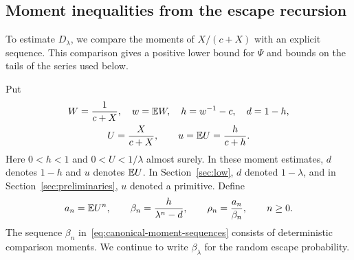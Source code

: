 \subsection{Moment inequalities from the escape recursion}
To estimate $D_\lambda$, we compare the moments of $X/(c+X)$ with an explicit sequence. This comparison gives a positive lower bound for $\Psi$ and bounds on the tails of the series used below.

Put
\begin{equation}\label{eq:archive-parameters}
 \begin{gathered}
 W=\frac1{c+X},\quad w=\mathbb E W,\quad h=w^{-1}-c,\quad d=1-h,\\
 U=\frac{X}{c+X},\qquad u=\mathbb E U=\frac{h}{c+h}.
 \end{gathered}
\end{equation}
Here $0<h<1$ and $0<U<1/\lambda$ almost surely. In these moment estimates, $d$ denotes $1-h$ and $u$ denotes $\mathbb E U$. In Section~\ref{sec:low}, $d$ denoted $1-\lambda$, and in Section~\ref{sec:preliminaries}, $u$ denoted a primitive. Define
\begin{equation}\label{eq:canonical-moment-sequences}
 a_n=\mathbb E U^n,\qquad \beta_n=\frac{h}{\lambda^n-d},\qquad
 \rho_n=\frac{a_n}{\beta_n},\qquad n\ge0.
\end{equation}
The sequence $\beta_n$ in~\eqref{eq:canonical-moment-sequences} consists of deterministic comparison moments. We continue to write $\beta_\lambda$ for the random escape probability.

